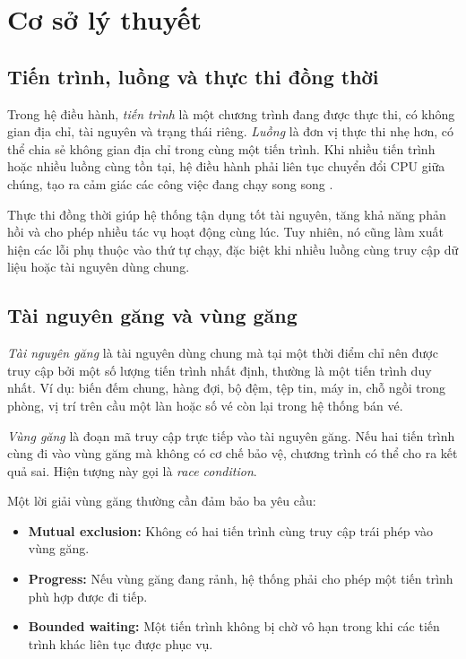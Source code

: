 \chapter{Cơ sở lý thuyết}

\section{Tiến trình, luồng và thực thi đồng thời}

Trong hệ điều hành, \textit{tiến trình} là một chương trình đang được thực thi, có không gian địa chỉ, tài nguyên và trạng thái riêng. \textit{Luồng} là đơn vị thực thi nhẹ hơn, có thể chia sẻ không gian địa chỉ trong cùng một tiến trình. Khi nhiều tiến trình hoặc nhiều luồng cùng tồn tại, hệ điều hành phải liên tục chuyển đổi CPU giữa chúng, tạo ra cảm giác các công việc đang chạy song song \cite{silberschatz,tanenbaum}.

Thực thi đồng thời giúp hệ thống tận dụng tốt tài nguyên, tăng khả năng phản hồi và cho phép nhiều tác vụ hoạt động cùng lúc. Tuy nhiên, nó cũng làm xuất hiện các lỗi phụ thuộc vào thứ tự chạy, đặc biệt khi nhiều luồng cùng truy cập dữ liệu hoặc tài nguyên dùng chung.

\section{Tài nguyên găng và vùng găng}

\textit{Tài nguyên găng} là tài nguyên dùng chung mà tại một thời điểm chỉ nên được truy cập bởi một số lượng tiến trình nhất định, thường là một tiến trình duy nhất. Ví dụ: biến đếm chung, hàng đợi, bộ đệm, tệp tin, máy in, chỗ ngồi trong phòng, vị trí trên cầu một làn hoặc số vé còn lại trong hệ thống bán vé.

\textit{Vùng găng} là đoạn mã truy cập trực tiếp vào tài nguyên găng. Nếu hai tiến trình cùng đi vào vùng găng mà không có cơ chế bảo vệ, chương trình có thể cho ra kết quả sai. Hiện tượng này gọi là \textit{race condition}.

Một lời giải vùng găng thường cần đảm bảo ba yêu cầu:

\begin{itemize}
    \item \textbf{Mutual exclusion:} Không có hai tiến trình cùng truy cập trái phép vào vùng găng.
    \item \textbf{Progress:} Nếu vùng găng đang rảnh, hệ thống phải cho phép một tiến trình phù hợp được đi tiếp.
    \item \textbf{Bounded waiting:} Một tiến trình không bị chờ vô hạn trong khi các tiến trình khác liên tục được phục vụ.
\end{itemize}

